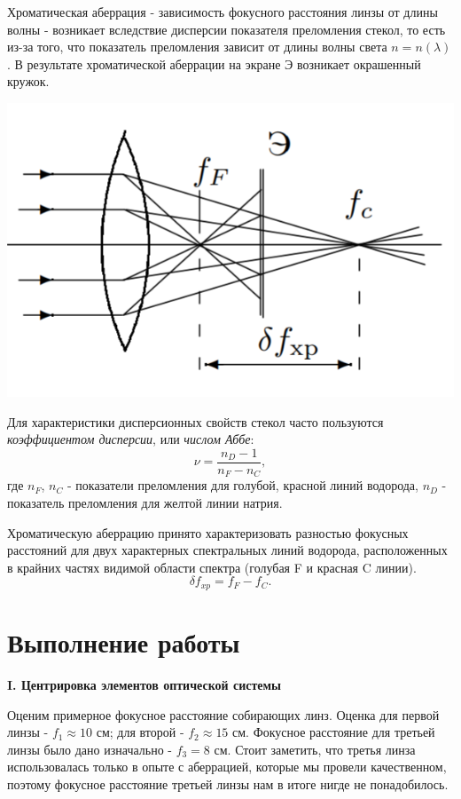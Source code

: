 \documentclass[a4paper,12pt]{report}
\begin{document}
Хроматическая аберрация - зависимость фокусного расстояния линзы от длины волны - возникает вследствие дисперсии показателя преломления стекол, то есть из-за того, что показатель преломления зависит от длины волны света $n = n(\lambda)$. В результате хроматической аберрации на экране Э возникает окрашенный кружок.
\begin{center}
    \includegraphics[scale = 0.5]{pic6.PNG}
\end{center}
Для характеристики дисперсионных свойств стекол часто пользуются \textit{коэффициентом дисперсии}, или \textit{числом Аббе}:
\begin{equation}
    \nu = \frac{n_{D}-1}{n_{F}-n_{C}},
\end{equation}
где $n_{F}$, $n_{C}$ - показатели преломления для голубой, красной линий водорода, $n_{D}$ - показатель преломления для желтой линии натрия.

Хроматическую аберрацию принято характеризовать разностью фокусных расстояний для двух характерных спектральных линий водорода, расположенных в крайних частях видимой области спектра (голубая F и красная C линии).
\begin{equation}
    \delta f_{xp} = f_{F}-f_{C}.
\end{equation}

\newpage
\section*{\huge{Выполнение работы}}

\noindent\textbf{I. Центрировка элементов оптической системы}

Оценим примерное фокусное расстояние собирающих линз. Оценка для первой линзы - $f_{1} \approx 10 $ см; для второй - $f_{2} \approx 15$ см. Фокусное расстояние для третьей линзы было дано изначально - $f_{3} = 8$ см. Стоит заметить, что третья линза использовалась только в опыте с аберрацией, которые мы провели качественном, поэтому фокусное расстояние третьей линзы нам в итоге нигде не понадобилось.
\end{document}
